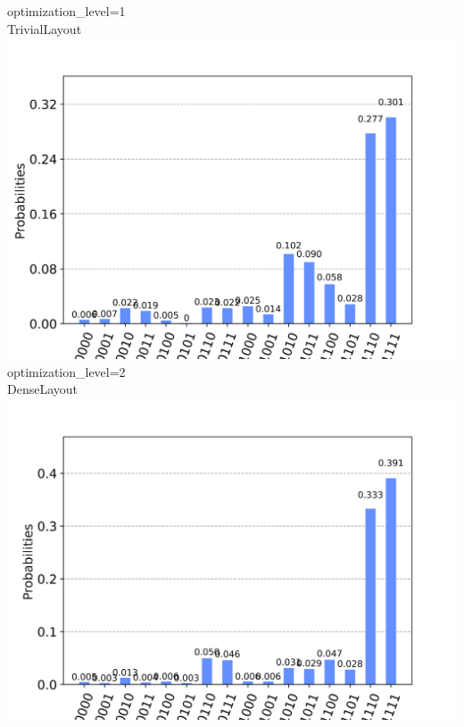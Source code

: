 \documentclass[aspectratio=169,11pt,hyperref={colorlinks=true}]{beamer}
\begin{document}
\begin{frame}
    \begin{columns}
            \centering
            optimization\_level=1\\
            TrivialLayout\\
            \includegraphics[width=\textwidth, height=.4\textheight, keepaspectratio]{layout_1_results.png}\\
            optimization\_level=2\\
            DenseLayout\\
        \includegraphics[width=\textwidth, height=.4\textheight, keepaspectratio]{layout_2_results.png}


\end{columns}
\end{frame}
\end{document}

